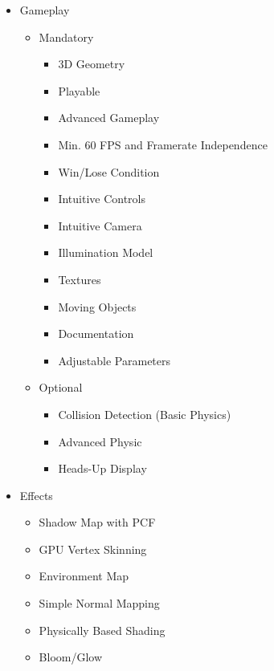 \documentclass{article}
\begin{document}
    \begin{itemize}
        \item Gameplay
        \begin{itemize}
            \item Mandatory
            \begin{itemize}
                \item 3D Geometry
                \item Playable
                \item Advanced Gameplay
                \item Min. 60 FPS and Framerate Independence
                \item Win/Lose Condition
                \item Intuitive Controls
                \item Intuitive Camera
                \item Illumination Model
                \item Textures
                \item Moving Objects
                \item Documentation
                \item Adjustable Parameters
            \end{itemize}

            \item Optional
            \begin{itemize}
                \item Collision Detection (Basic Physics)
                \item Advanced Physic
                \item Heads-Up Display
            \end{itemize}
        \end{itemize}
        \item Effects
        \begin{itemize}
            \item Shadow Map with PCF
            \item GPU Vertex Skinning
            \item Environment Map
            \item Simple Normal Mapping
            \item Physically Based Shading
            \item Bloom/Glow
        \end{itemize}
    \end{itemize}
\end{document}
